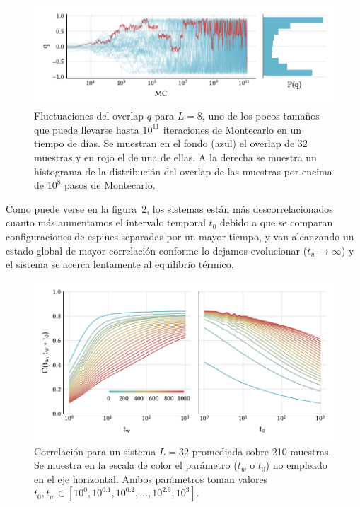 \documentclass[11pt]{report}
\begin{document}
\begin{figure}
  \centering
  \includegraphics{../study_cases/overlap/overlap.pdf}
  \caption{Fluctuaciones del overlap $q$ para $L=8$, uno de los pocos
    tamaños que puede llevarse hasta $10^{11}$ iteraciones de
    Montecarlo en un tiempo de días. Se muestran en el fondo (azul) el
    overlap de 32 muestras y en rojo el de una de ellas. A la derecha
    se muestra un histograma de la distribución del overlap de las
    muestras por encima de $10^8$ pasos de Montecarlo.}
  \label{fig:overlap}
\end{figure}

Como puede verse en la figura~\ref{fig:corrfunction}, los sistemas
están más descorrelacionados cuanto más aumentamos el intervalo
temporal $t_0$ debido a que se comparan configuraciones de espines
separadas por un mayor tiempo, y van alcanzando un estado global de
mayor correlación conforme lo dejamos evolucionar ($t_w → ∞$) y el
sistema se acerca lentamente al equilibrio térmico.

\begin{figure}
  \centering
  \includegraphics{../study_cases/corr_functional_dependence/corrfunction.pdf}
  \caption{Correlación para un sistema $L=32$ promediada sobre 210
    muestras. Se muestra en la escala de color el parámetro ($t_w$ o
    $t_0$) no empleado en el eje horizontal. Ambos parámetros toman
    valores $t_0,t_w∈[10^0, 10^{0.1},10^{0.2},\ldots,10^{2.9},10^3]$.}
  \label{fig:corrfunction}
\end{figure}
\end{document}
